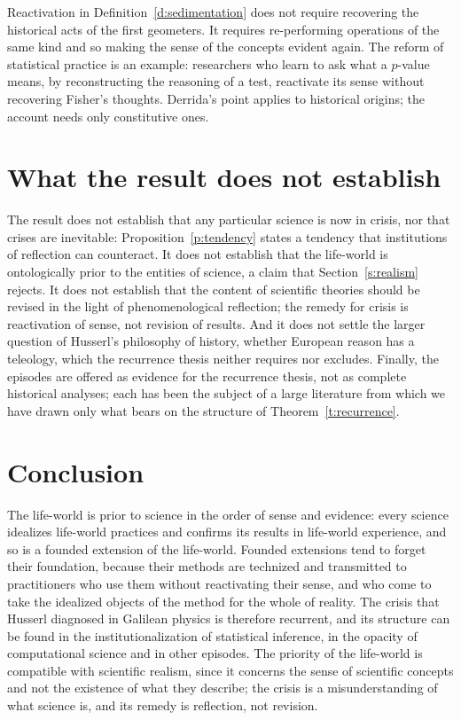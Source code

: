 \documentclass{situationist-preprint}
\begin{document}
\begin{reply}
Reactivation in Definition~\ref{d:sedimentation} does not require recovering the historical acts of the first geometers. It requires re-performing operations of the same kind and so making the sense of the concepts evident again. The reform of statistical practice is an example: researchers who learn to ask what a $p$-value means, by reconstructing the reasoning of a test, reactivate its sense without recovering Fisher's thoughts. Derrida's point applies to historical origins; the account needs only constitutive ones.
\end{reply}

\section{What the result does not establish}

The result does not establish that any particular science is now in crisis, nor that crises are inevitable: Proposition~\ref{p:tendency} states a tendency that institutions of reflection can counteract. It does not establish that the life-world is ontologically prior to the entities of science, a claim that Section~\ref{s:realism} rejects. It does not establish that the content of scientific theories should be revised in the light of phenomenological reflection; the remedy for crisis is reactivation of sense, not revision of results. And it does not settle the larger question of Husserl's philosophy of history, whether European reason has a teleology, which the recurrence thesis neither requires nor excludes. Finally, the episodes are offered as evidence for the recurrence thesis, not as complete historical analyses; each has been the subject of a large literature from which we have drawn only what bears on the structure of Theorem~\ref{t:recurrence}.

\section{Conclusion}

The life-world is prior to science in the order of sense and evidence: every science idealizes life-world practices and confirms its results in life-world experience, and so is a founded extension of the life-world. Founded extensions tend to forget their foundation, because their methods are technized and transmitted to practitioners who use them without reactivating their sense, and who come to take the idealized objects of the method for the whole of reality. The crisis that Husserl diagnosed in Galilean physics is therefore recurrent, and its structure can be found in the institutionalization of statistical inference, in the opacity of computational science and in other episodes. The priority of the life-world is compatible with scientific realism, since it concerns the sense of scientific concepts and not the existence of what they describe; the crisis is a misunderstanding of what science is, and its remedy is reflection, not revision.
\end{document}
